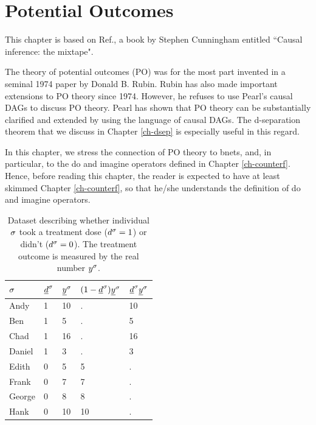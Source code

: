 \chapter{Potential Outcomes}
\label{ch-po}
This chapter
is based on Ref.\cite{book-mixtape},
a book by Stephen Cunningham entitled 
``Causal inference: the mixtape".

The theory of potential
outcomes (PO) was for the most part
invented in a seminal
1974 paper by Donald B. Rubin. Rubin
has also
made important extensions
to PO theory since 1974. However, he refuses to
use Pearl's causal DAGs to discuss PO theory. 
Pearl has shown that PO theory
can be substantially clarified
and extended by using
the language of causal DAGs.
The d-separation theorem 
that we discuss in  Chapter \ref{ch-dsep}
is especially
useful in this regard.


In this chapter, we stress the
connection
of PO theory to bnets,
and, in particular, to 
the do and imagine operators 
defined in Chapter \ref{ch-counterf}. Hence,
before reading this chapter,
the reader is expected to have at least
skimmed  Chapter \ref{ch-counterf},
so that he/she understands
the definition
of do and imagine operators.

\begin{table}[h!]
\centering
\begin{tabular}{|l|l|l|l|l|}
\hline
\rowcolor[HTML]{ECF4FF} 
$\sigma$ & ${\underline{d}}^\sigma$ & ${\underline{y}}^\sigma$ & $(1-{\underline{d}}^\sigma){\underline{y}}^\sigma$ & ${\underline{d}}^\sigma{\underline{y}}^\sigma$ \\ \hline
Andy & \cellcolor[HTML]{FFFFC7}1 & 10 & . & 10 \\ \hline
Ben & \cellcolor[HTML]{FFFFC7}1 & 5 & . & 5 \\ \hline
Chad & \cellcolor[HTML]{FFFFC7}1 & 16 & . & 16 \\ \hline
Daniel & \cellcolor[HTML]{FFFFC7}1 & 3 & . & 3 \\ \hline
Edith & 0 & 5 & 5 & . \\ \hline
Frank & 0 & 7 & 7 & . \\ \hline
George & 0 & 8 & 8 & . \\ \hline
Hank & 0 & 10 & 10 & . \\ \hline
\end{tabular}
\caption{Dataset describing whether
individual $\sigma$
took a treatment dose ($d^\sigma=1$)
or didn't ($d^\sigma=0$).
The 
treatment outcome
is measured by the real number $y^\sigma$.}
\label{tab-pot-out-missing}
\end{table} 

